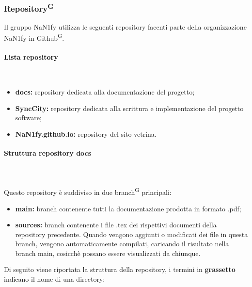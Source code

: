 \documentclass[8pt]{article}
\newcommand{\glossterm}[1]{#1\textsuperscript{G}} %
\newcommand{\subsubsubsection}[1]{\paragraph{#1}\mbox{}\\}
\begin{document}
\subsubsection{\glossterm{Repository}}
Il gruppo NaN1fy utilizza le seguenti repository facenti parte della organizzazione NaN1fy in \glossterm{Github}.
\subsubsubsection{Lista repository}
\begin{itemize}
    \item \textbf{docs:} repository dedicata alla documentazione del progetto;
    \item \textbf{SyncCity:} repository dedicata alla scrittura e implementazione del progetto software;
    \item \textbf{NaN1fy.github.io:} repository del sito vetrina.
\end{itemize}
\subsubsubsection{Struttura repository docs} \\
Questo repository è suddiviso in due \glossterm{branch} principali:
\begin{itemize}
    \item \textbf{main:} branch contenente tutti la documentazione prodotta in formato .pdf;
    \item \textbf{sources:} branch contenente i file .tex dei rispettivi documenti della repository
        precedente. Quando vengono aggiunti o modificati dei file in questa branch, vengono
        automaticamente compilati, caricando il risultato nella branch main, cosicchè possano essere visualizzati da chiunque.
\end{itemize}
Di seguito viene riportata la struttura della repository, i termini in \textbf{grassetto} indicano il nome di una directory:
\end{document}
